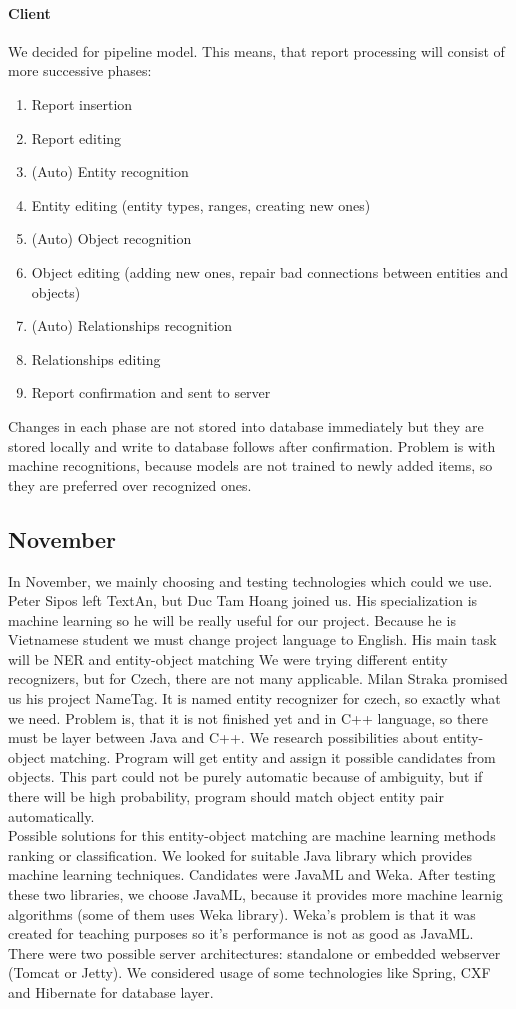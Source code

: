 \paragraph{Client}
We decided for pipeline model. This means, that report processing will consist of more successive phases:
\begin{enumerate}
\item Report insertion
\item Report editing
\item (Auto) Entity recognition
\item Entity editing (entity types, ranges, creating new ones)
\item (Auto) Object recognition
\item Object editing (adding new ones, repair bad connections between entities and objects)
\item (Auto) Relationships recognition
\item Relationships editing
\item Report confirmation and sent to server
\end{enumerate}
Changes in each phase are not stored into database immediately but they are stored locally and write to database follows after confirmation. Problem is with machine recognitions, because models are not trained to newly added items, so they are preferred over recognized ones.
 
\subsection{November}
In November, we mainly choosing and testing technologies which could we use.
Peter Sipos left TextAn, but Duc Tam Hoang joined us. His specialization is machine learning so he will be really useful for our project. Because he is Vietnamese student we must change project language to English. His main task will be NER and entity-object matching
We were trying different entity recognizers, but for Czech, there are not many applicable. Milan Straka promised us his project NameTag. It is named entity recognizer for czech, so exactly what we need. Problem is, that it is not finished yet and in C++ language, so there must be layer between Java and C++.
We research possibilities about entity-object matching. Program will get entity and assign it possible candidates from objects. This part could not be purely automatic because of ambiguity, but if there will be high probability, program should match object entity pair automatically. \\
Possible solutions for this entity-object matching are machine learning  methods ranking or classification.
We looked for suitable Java library which provides machine learning techniques. Candidates were JavaML and Weka. After testing these two libraries, we choose JavaML, because it provides more machine learnig algorithms (some of them uses Weka library). Weka's problem is that it was created for teaching purposes so it's performance is not as good as JavaML.
There were two possible server architectures: standalone or embedded webserver (Tomcat or Jetty). We considered usage of some technologies like Spring, CXF and Hibernate for database layer.
